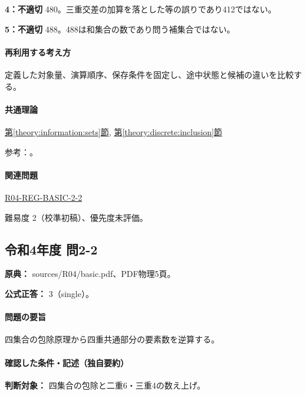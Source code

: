 \noindent\textbf{4：不適切} 480。三重交差の加算を落とした等の誤りであり412ではない。\par

\noindent\textbf{5：不適切} 488。488は和集合の数であり問う補集合ではない。\par

\paragraph{再利用する考え方} 定義した対象量、演算順序、保存条件を固定し、途中状態と候補の違いを比較する。

\paragraph{共通理論} \hyperref[theory:information:sets]{第\ref*{theory:information:sets}節}, \hyperref[theory:discrete:inclusion]{第\ref*{theory:discrete:inclusion}節}

\par 参考：\cite{mit_discrete2015}。

\paragraph{関連問題} \hyperref[q:r04-reg-basic-2-2]{R04-REG-BASIC-2-2}

\par 難易度 2（校準初稿）、優先度未評価。

\subsection{令和4年度 問2-2}
\label{q:r04-reg-basic-2-2}

\noindent\textbf{原典：} sources/R04/basic.pdf、PDF物理5頁。

\textbf{公式正答：} 3（single）。

\paragraph{問題の要旨} 四集合の包除原理から四重共通部分の要素数を逆算する。

\paragraph{確認した条件・記述（独自要約）}\mbox{}\par

\noindent\textbf{判断対象：} 四集合の包除と二重6・三重4の数え上げ。\par


